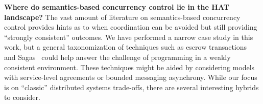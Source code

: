 \textbf{Where do semantics-based concurrency control lie in the HAT
  landscape?} The vast amount of literature on semantics-based
concurrency control provides hints as to when coordination can be
avoided but still providing ``strongly consistent'' outcomes. We have
performed a narrow case study in this work, but a general
taxonomization of techniques such as escrow transactions~\cite{escrow}
and Sagas~\cite{sagas} could help answer the challenge of programming
in a weakly consistent environment. These techniques might be aided by
considering models with service-level agreements or bounded messaging
asynchrony. While our focus is on ``classic'' distributed systems
trade-offs, there are several interesting hybrids to consider.
